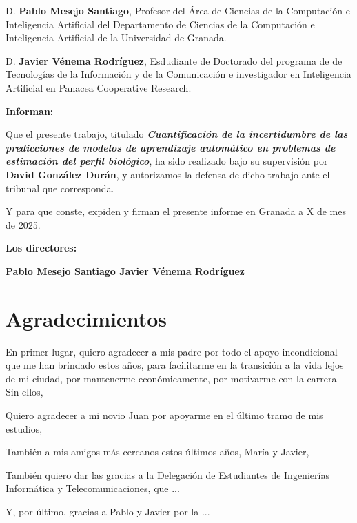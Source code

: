 D. \textbf{Pablo Mesejo Santiago}, Profesor del Área de Ciencias de la Computación e Inteligencia Artificial del Departamento de Ciencias de la Computación e Inteligencia Artificial de la Universidad de Granada.

\vspace{0.5cm}

D. \textbf{Javier Vénema Rodríguez}, Esdudiante de Doctorado del programa de de Tecnologías de la Información y de la Comunicación e investigador en Inteligencia Artificial en Panacea Cooperative Research.

\vspace{0.5cm}

\textbf{Informan:}

\vspace{0.5cm}

Que el presente trabajo, titulado \textit{\textbf{Cuantificación de la incertidumbre de las predicciones de modelos de aprendizaje automático en problemas de estimación del perfil biológico}},
ha sido realizado bajo su supervisión por \textbf{David González Durán}, y autorizamos la defensa de dicho trabajo ante el tribunal
que corresponda.

\vspace{0.5cm}

Y para que conste, expiden y firman el presente informe en Granada a X de mes de 2025.

\vspace{1cm}

\textbf{Los directores:}

\vspace{5cm}

\noindent \textbf{Pablo Mesejo Santiago \hfill Javier Vénema Rodríguez}


\cleardoublepage
\chapter*{Agradecimientos}
\thispagestyle{empty}

\vspace{1cm}

En primer lugar, quiero agradecer a mis padre por todo el apoyo incondicional que me han brindado estos años, para facilitarme en la transición a la vida lejos de mi ciudad, por mantenerme económicamente, por motivarme con la carrera 
Sin ellos, 

Quiero agradecer a mi novio Juan por apoyarme en el último tramo de mis estudios, 

También a mis amigos más cercanos estos últimos años, María y Javier, 

También quiero dar las gracias a la Delegación de Estudiantes de Ingenierías Informática y Telecomunicaciones, que ...


Y, por último, gracias a Pablo y Javier por la ...
